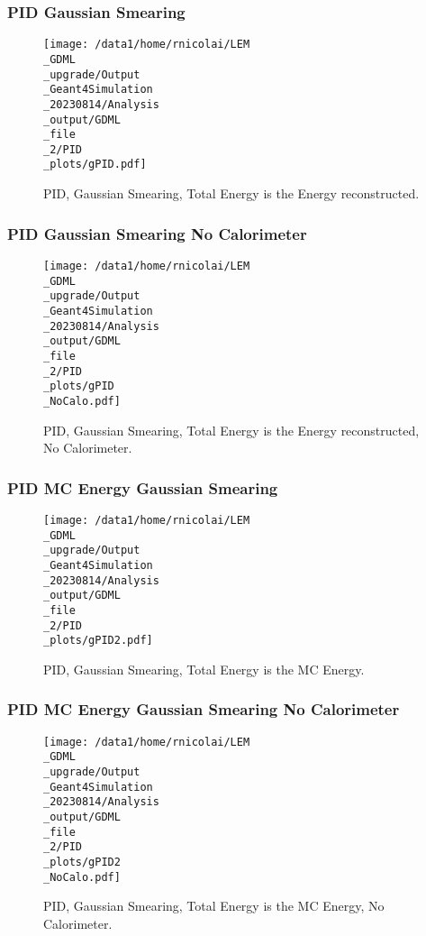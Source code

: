 \documentclass[8pt]{beamer}
\begin{document}
            \begin{frame}
                \frametitle{PID Gaussian Smearing}
            
        \begin{figure}[h]
            \centering
            \texttt{[image: /data1/home/rnicolai/LEM\\\_GDML\\\_upgrade/Output\\\_Geant4Simulation\\\_20230814/Analysis\\\_output/GDML\\\_file\\\_2/PID\\\_plots/gPID.pdf]}
            \caption{PID, Gaussian Smearing, Total Energy is the Energy reconstructed.}
        \end{figure}
        
            \end{frame}
            
            \begin{frame}
                \frametitle{PID Gaussian Smearing No Calorimeter}
            
        \begin{figure}[h]
            \centering
            \texttt{[image: /data1/home/rnicolai/LEM\\\_GDML\\\_upgrade/Output\\\_Geant4Simulation\\\_20230814/Analysis\\\_output/GDML\\\_file\\\_2/PID\\\_plots/gPID\\\_NoCalo.pdf]}
            \caption{PID, Gaussian Smearing, Total Energy is the Energy reconstructed, No Calorimeter.}
        \end{figure}
        
            \end{frame}
            
            \begin{frame}
                \frametitle{PID MC Energy Gaussian Smearing}
            
        \begin{figure}[h]
            \centering
            \texttt{[image: /data1/home/rnicolai/LEM\\\_GDML\\\_upgrade/Output\\\_Geant4Simulation\\\_20230814/Analysis\\\_output/GDML\\\_file\\\_2/PID\\\_plots/gPID2.pdf]}
            \caption{PID, Gaussian Smearing, Total Energy is the MC Energy.}
        \end{figure}
        
            \end{frame}
            
            \begin{frame}
                \frametitle{PID MC Energy Gaussian Smearing No Calorimeter}
            
        \begin{figure}[h]
            \centering
            \texttt{[image: /data1/home/rnicolai/LEM\\\_GDML\\\_upgrade/Output\\\_Geant4Simulation\\\_20230814/Analysis\\\_output/GDML\\\_file\\\_2/PID\\\_plots/gPID2\\\_NoCalo.pdf]}
            \caption{PID, Gaussian Smearing, Total Energy is the MC Energy, No Calorimeter.}
        \end{figure}
        
            \end{frame}
            
\end{document}

